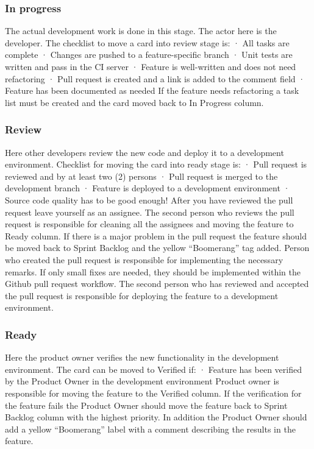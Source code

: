 \documentclass[english]{tktltiki2}
\theoremstyle{definition}
\theoremstyle{remark}
\begin{document}
\subsubsection{In progress}
The actual development work is done in this stage. The actor here is the developer. The checklist to move a card into review stage is:
·       All tasks are complete
·       Changes are pushed to a feature-specific branch
·       Unit tests are written and pass in the CI server
·       Feature is well-written and does not need refactoring
·       Pull request is created and a link is added to the comment field
·       Feature has been documented as needed
If the feature needs refactoring a task list must be created and the card moved back to In Progress column.

\subsubsection{Review}
Here other developers review the new code and deploy it to a development environment. Checklist for moving the card into ready stage is:
·       Pull request is reviewed and by at least two (2) persons
·       Pull request is merged to the development branch
·       Feature is deployed to a development environment
·       Source code quality has to be good enough!
After you have reviewed the pull request leave yourself as an assignee. The second person who reviews the pull request is responsible for cleaning all the assignees and moving the feature to Ready column.
If there is a major problem in the pull request the feature should be moved back to Sprint Backlog and the yellow “Boomerang” tag added. Person who created the pull request is responsible for implementing the necessary remarks.
If only small fixes are needed, they should be implemented within the Github pull request workflow.
The second person who has reviewed and accepted the pull request is responsible for deploying the feature to a development environment.

\subsubsection{Ready}
Here the product owner verifies the new functionality in the development environment. The card can be moved to Verified if:
·       Feature has been verified by the Product Owner in the development environment
Product owner is responsible for moving the feature to the Verified column.
If the verification for the feature fails the Product Owner should move the feature back to Sprint Backlog column with the highest priority. In addition the Product Owner should add a yellow “Boomerang” label with a comment describing the results in the feature.
\end{document}
